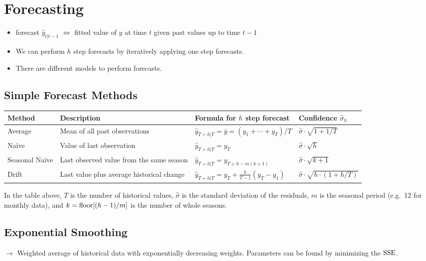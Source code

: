 \begin{minipage}[t]{0.63\textwidth}
\section{Forecasting}
\begin{itemize}
\item forecast $ \hat{y}_{t|t-1} $ $\Leftrightarrow$ fitted value of $ y $ at time $ t $ given past values up to time $ t - 1 $
\item We can perform $h$ step forecasts by iteratively applying one step forecasts.
\item There are different models to perform forecasts.
\end{itemize}
\end{minipage}

\subsection{Simple Forecast Methods}
\begin{tabular}{@{}llll@{}}\toprule
    Method & Description & Formula for \(h\) step forecast & Confidence \(\hat{\sigma}_h\)\\ \midrule
    Average & Mean of all past observations & \(\hat{y}_{T+h|T} = \bar{y} = (y_1 + \cdots + y_T) / T \) &  \(\hat{\sigma} \cdot \sqrt{1+1/T}\) \\
    Naïve & Value of last observation & \(\hat{y}_{T+h|T} = y_T\) & \(\hat{\sigma} \cdot \sqrt{h}\) \\
    Seasonal Naïve & Last observed value from the same season & \(\hat{y}_{T+h|T} = y_{T+h-m(k+1)}\) & \(\hat{\sigma} \cdot \sqrt{k+1}\)\\
    Drift & Last value plus average historical change & \(\hat{y}_{T+h|T} = y_T + \frac{h}{T-1}(y_T-y_1)\) & \(\hat{\sigma} \cdot \sqrt{h \cdot (1+h/T)}\)\\
    \bottomrule
\end{tabular}

In the table above, \(T\) is the number of historical values, \(\hat{\sigma}\) is the standard deviation of the residuals,
\(m\) is the seasonal period (e.g.\ 12 for monthly data), and \(k = \operatorname{floor}[(h-1)/m]\) is the number of whole seasons.


\subsection{Exponential Smoothing}
\(\rightarrow\) Weighted average of historical data with exponentially decreasing weights.
Parameters can be found by minimizing the $ \operatorname{SSE} $.

